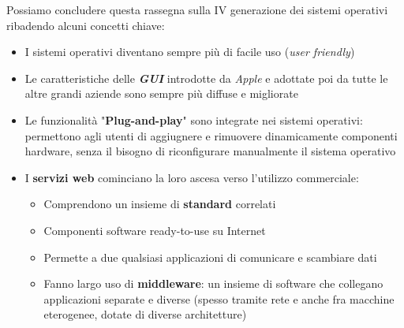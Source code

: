 \documentclass[12pt, letterpaper]{article}
\begin{document}
Possiamo concludere questa rassegna sulla IV generazione dei sistemi operativi ribadendo alcuni concetti chiave:
\begin{itemize}
    \item I sistemi operativi diventano sempre più di facile uso (\textit{user friendly})
    \item Le caratteristiche delle \textit{\textbf{GUI}} introdotte da \textit{Apple} e adottate poi da tutte le altre grandi aziende sono sempre più diffuse e migliorate
    \item Le funzionalità "\textbf{Plug-and-play}" sono integrate nei sistemi operativi: permettono agli utenti di aggiugnere e rimuovere dinamicamente componenti hardware, senza il bisogno di riconfigurare manualmente il sistema operativo
    \item I \textbf{servizi web} cominciano la loro ascesa verso l'utilizzo commerciale:
        \begin{itemize}
            \item Comprendono un insieme di \textbf{standard} correlati
            \item Componenti software ready-to-use su Internet
            \item Permette a due qualsiasi applicazioni di comunicare e scambiare dati
            \item Fanno largo uso di \textbf{middleware}: un insieme di software che collegano applicazioni separate e diverse (spesso tramite rete e anche fra macchine eterogenee, dotate di diverse architetture)
        \end{itemize}
\end{itemize}
\end{document}
